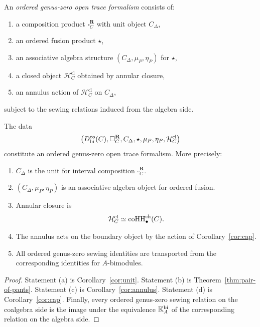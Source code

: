 \begin{definition}
An \emph{ordered genus-zero open trace formalism} consists of:
\begin{enumerate}[label=(\roman*)]
\item a composition product $\square_C^{\mathbf R}$ with unit object $C_\Delta$,
\item an ordered fusion product $\star$,
\item an associative algebra structure $(C_\Delta,\mu_P,\eta_P)$ for $\star$,
\item a closed object $\mathcal H_C^{\mathrm{cl}}$ obtained by annular closure,
\item an annulus action of $\mathcal H_C^{\mathrm{cl}}$ on $C_\Delta$,
\end{enumerate}
subject to the sewing relations induced from the algebra side.
\end{definition}

\begin{theorem}
The data
\[
\bigl(D^{\mathrm{co}}_{\mathrm{bi}}(C),\square_C^{\mathbf R},C_\Delta,\star,\mu_P,\eta_P,\mathcal H_C^{\mathrm{cl}}\bigr)
\]
constitute an ordered genus-zero open trace formalism. More precisely:
\begin{enumerate}[label=(\alph*)]
\item $C_\Delta$ is the unit for interval composition $\square_C^{\mathbf R}$.
\item $(C_\Delta,\mu_P,\eta_P)$ is an associative algebra object for ordered fusion.
\item Annular closure is
\[
\mathcal H_C^{\mathrm{cl}}\simeq \operatorname{coHH}^{\mathrm{ch}}_\bullet(C).
\]
\item The annulus acts on the boundary object by the action of
Corollary~\ref{cor:cap}.
\item All ordered genus-zero sewing identities are transported from the corresponding identities for
$A$-bimodules.
\end{enumerate}
\end{theorem}

\begin{proof}
Statement (a) is Corollary~\ref{cor:unit}. Statement (b) is
Theorem~\ref{thm:pair-of-pants}. Statement (c) is
Corollary~\ref{cor:annulus}. Statement (d) is Corollary~\ref{cor:cap}.
Finally, every ordered genus-zero sewing relation on the coalgebra side is the image under the
equivalence $\mathbb{K}_A^{\mathrm{bi}}$ of the corresponding relation on the algebra side.
\end{proof}

